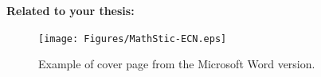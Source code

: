 \textbf{Related to your thesis:}
\begin{description}
	\item[\PVerb{\school}] 
	\item[\PVerb{\cotutele}]
	\item[\PVerb{\covertype}]
	\item[\PVerb{\keywordnames}]
	\item[\PVerb{\keywordFnames}]
	\item[\PVerb{\abstractT}]
	\item[\PVerb{\abstractTF}]
	\item[\PVerb{\subjectname}]
	\item[\PVerb{\title}]
	\item[\PVerb{\subtitle}]
	\item[\PVerb{\titleF}]
	\item[\PVerb{\subtitleF}]
	\item[\PVerb{\deptname}]
	\item[\PVerb{\deptnumber}]
	\item[\PVerb{\addcomue}]
	\item[\PVerb{\cityname}]
	\item[\PVerb{\theseorder}]
	\item[\PVerb{\labname}]
	\item[\PVerb{\advisor}]
	\item[\PVerb{\rapporteur}]
	\item[\PVerb{\examinateur}]
	\item[\PVerb{\invite}]
	\item[\PVerb{\president}]
\end{description}	


\begin{figure}[tb]
	\centering
	\texttt{[image: Figures/MathStic-ECN.eps]}
	\caption[Example of cover page.]{Example of cover page from the Microsoft Word version.}
	\label{fig:mathstic-ecn}
\end{figure}



